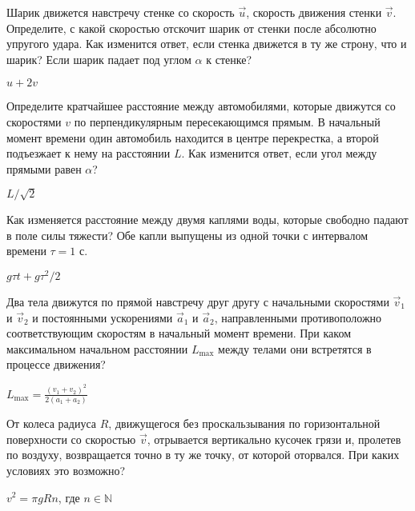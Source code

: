 \begin{ex}
Шарик движется навстречу стенке со скорость $\vec u$, скорость движения стенки $\vec v$. 
Определите, с какой скоростью отскочит шарик от стенки после абсолютно упругого удара. 
Как изменится ответ, если стенка движется в ту же строну, что и шарик? 
Если шарик падает под углом $ \alpha $ к стенке?
\begin{ans}
$u + 2v$
\end{ans}
\end{ex}

\begin{ex}
Определите кратчайшее расстояние между автомобилями, которые движутся со скоростями $v$ по перпендикулярным пересекающимся прямым. 
В начальный момент времени один автомобиль находится в центре перекрестка, а второй подъезжает к нему на расстоянии $L$. 
Как изменится ответ, если угол между прямыми равен $\alpha$?
\begin{ans}
$L/\sqrt{2}$
\end{ans}
\end{ex}

\begin{ex}
Как изменяется расстояние между двумя каплями воды, которые свободно падают в поле силы тяжести? 
Обе капли выпущены из одной точки с интервалом времени $\tau = 1$ с.
\begin{ans}
$g \tau t + g \tau^2 / 2$
\end{ans}
\end{ex}

\begin{ex}
Два тела движутся по прямой навстречу друг другу с начальными скоростями $\vec{v}_1$ и $\vec{v}_2$ и 
постоянными ускорениями $\vec{a}_1$ и $\vec{a}_2$, направленными противоположно соответствующим скоростям в начальный момент времени. 
При каком максимальном начальном расстоянии $L_{\max}$ между телами они встретятся в процессе движения?
\begin{ans}
$L_{\max} = \frac{(v_1 + v_2)^2}{2(a_1+a_2)}$
\end{ans}
\end{ex}

\begin{ex}
От колеса радиуса $R$, движущегося без проскальзывания по горизонтальной поверхности со скоростью $\vec v$,  отрывается вертикально кусочек грязи и, пролетев по воздуху, возвращается точно в ту же точку, от которой оторвался. При каких условиях это возможно?
\begin{ans}
$v^2 = \pi g R n$, где $n \in \mathbb{N}$
\end{ans}
\end{ex}

